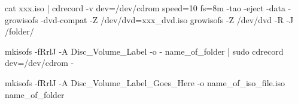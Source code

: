 cat xxx.iso | cdrecord -v dev=/dev/cdrom speed=10 fs=8m -tao -eject -data -
growisofs -dvd-compat -Z /dev/dvd=xxx_dvd.iso
growisofs -Z /dev/dvd -R -J /folder/

mkisofs -fRrlJ -A Disc_Volume_Label -o - name_of_folder | sudo cdrecord dev=/dev/cdrom -

mkisofs -fRrlJ -A Disc_Volume_Label_Goes_Here -o name_of_iso_file.iso name_of_folder
